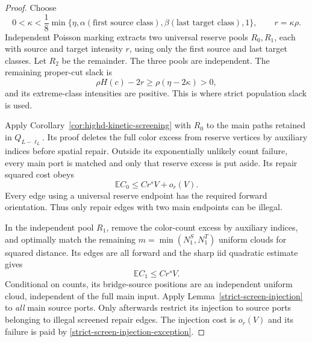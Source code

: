 \documentclass[11pt,reqno]{amsart}
\theoremstyle{definition}
\theoremstyle{remark}
\numberwithin{equation}{section}
\newcommand{\E}{\mathbb E}
\begin{document}
\begin{proof}
Choose
\[
 0<\kappa<
 \frac18\min\{\eta,\alpha(\text{first source class}),
                    \beta(\text{last target class}),1\},
 \qquad r=\kappa\rho.
\]
Independent Poisson marking extracts two universal reserve pools
\(R_0,R_1\), each with source and target intensity \(r\), using only
the first source and last target classes. Let \(R_2\) be the remainder.
The three pools are independent. The remaining proper-cut slack is
\begin{equation}
\label{strict-screen-residual-slack}
 \rho H(c)-2r\ge\rho(\eta-2\kappa)>0,
\end{equation}
and its extreme-class intensities are positive. This is where strict
population slack is used.

Apply Corollary~\ref{cor:highd-kinetic-screening} with \(R_0\) to the
main paths retained in \(Q_{L-\ell_L}\). Its proof deletes the full
color excess from reserve vertices by auxiliary indices before spatial
repair. Outside its exponentially unlikely count failure, every main
port is matched and only that reserve excess is put aside. Its repair
squared cost obeys
\begin{equation}
\label{strict-screen-first-pool}
 \E C_0\le Cr^sV+o_r(V).
\end{equation}
Every edge using a universal reserve endpoint has the required forward
orientation. Thus only repair edges with two main endpoints can be illegal.

In the independent pool \(R_1\), remove the color-count excess by
auxiliary indices, and optimally match the remaining
\(m=\min(N_1^S,N_1^T)\) uniform clouds for squared distance. Its edges are
all forward and the sharp iid quadratic estimate
\cite[Theorem~1.1]{GoldmanTrevisan2021} gives
\begin{equation}
\label{strict-screen-bridge-pool}
 \E C_1\le Cr^sV.
\end{equation}
Conditional on counts, its bridge-source positions are an independent
uniform cloud, independent of the full main input. Apply
Lemma~\ref{strict-screen-injection} to \emph{all} main source ports.
Only afterwards restrict its injection to source ports belonging to
illegal screened repair edges. The injection cost is \(o_r(V)\) and
its failure is paid by \eqref{strict-screen-injection-exception}.


\end{proof}
\end{document}
